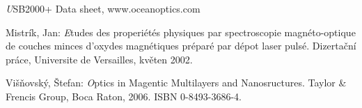 \begin{thebibliography}{99}
    {\emph USB2000+ Data sheet}, www.oceanoptics.com

    {\sc Mistrík}, Jan:
    {\emph Etudes des properiétés physiques par spectroscopie magnéto-optique de couches minces d'oxydes magnétiques préparé par dépot laser pulsé.}
    Dizertační práce, Universite de Versailles, květen 2002.

    {\sc Višňovský}, Štefan:
    {\emph Optics in Magentic Multilayers and Nanosructures.}
    Taylor \& Frencis Group, Boca Raton, 2006.
    ISBN 0-8493-3686-4.




\end{thebibliography}

